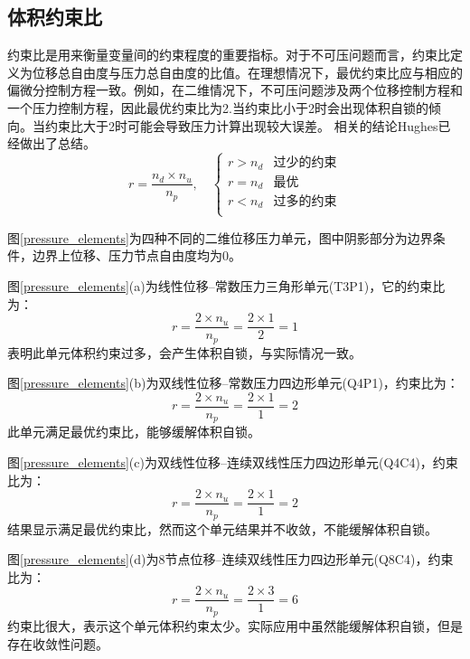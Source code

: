 \subsection{体积约束比}
约束比是用来衡量变量间的约束程度的重要指标。对于不可压问题而言，约束比定义为位移总自由度与压力总自由度的比值。在理想情况下，最优约束比应与相应的偏微分控制方程一致。例如，在二维情况下，不可压问题涉及两个位移控制方程和一个压力控制方程，因此最优约束比为2.当约束比小于2时会出现体积自锁的倾向。当约束比大于2时可能会导致压力计算出现较大误差。
相关的结论Hughes已经做出了总结\cite{hughes2000}。
\begin{equation}
    r = \frac{n_d\times n_u}{n_p}, \quad 
    \begin{cases}
        r > n_d & \text{过少的约束} \\
        r = n_d & \text{最优} \\
        r < n_d & \text{过多的约束} \\
    \end{cases}
\end{equation}

图\ref{pressure_elements}为四种不同的二维位移压力单元，图中阴影部分为边界条件，边界上位移、压力节点自由度均为0。

图\ref{pressure_elements}(a)为线性位移--常数压力三角形单元(T3P1)，它的约束比为：
\begin{equation}
    r= \frac{2\times n_u}{n_p}=\frac{2\times 1}{2}=1
\end{equation}
表明此单元体积约束过多，会产生体积自锁，与实际情况一致。

图\ref{pressure_elements}(b)为双线性位移--常数压力四边形单元(Q4P1)，约束比为：
\begin{equation}
    r= \frac{2\times n_u}{n_p}=\frac{2\times 1}{1}=2
\end{equation}
此单元满足最优约束比，能够缓解体积自锁。

图\ref{pressure_elements}(c)为双线性位移--连续双线性压力四边形单元(Q4C4)，约束比为：
\begin{equation}
    r= \frac{2\times n_u}{n_p}=\frac{2\times 1}{1}=2
\end{equation}
结果显示满足最优约束比，然而这个单元结果并不收敛，不能缓解体积自锁。

图\ref{pressure_elements}(d)为8节点位移--连续双线性压力四边形单元(Q8C4)，约束比为：
\begin{equation}
    r= \frac{2\times n_u}{n_p}=\frac{2\times 3}{1}=6
\end{equation}
约束比很大，表示这个单元体积约束太少。实际应用中虽然能缓解体积自锁，但是存在收敛性问题。

